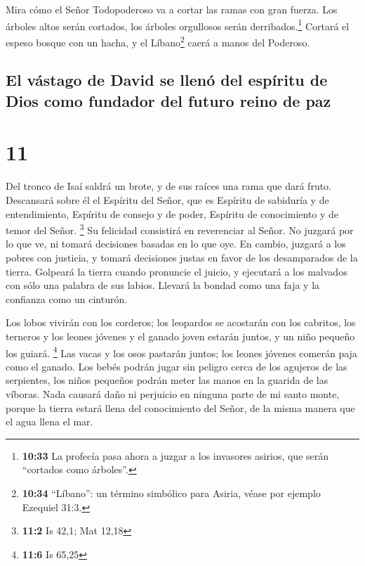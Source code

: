  Mira cómo el Señor Todopoderoso va a cortar las ramas
con gran fuerza. Los árboles altos serán cortados, los árboles
orgullosos serán derribados.\footnote{\textbf{10:33} La profecía pasa
  ahora a juzgar a los invasores asirios, que serán ``cortados como
  árboles''.}  Cortará el espeso bosque con un hacha, y
el Líbano\footnote{\textbf{10:34} ``Líbano'': un término simbólico para
  Asiria, véase por ejemplo Ezequiel 31:3.} caerá a manos del Poderoso.

\hypertarget{el-vuxe1stago-de-david-se-llenuxf3-del-espuxedritu-de-dios-como-fundador-del-futuro-reino-de-paz}{%
\subsection{El vástago de David se llenó del espíritu de Dios como
fundador del futuro reino de
paz}\label{el-vuxe1stago-de-david-se-llenuxf3-del-espuxedritu-de-dios-como-fundador-del-futuro-reino-de-paz}}

\hypertarget{section-10}{%
\section{11}\label{section-10}}

 Del tronco de Isaí saldrá un brote, y de sus raíces una
rama que dará fruto.  Descansará sobre él el Espíritu del
Señor, que es Espíritu de sabiduría y de entendimiento, Espíritu de
consejo y de poder, Espíritu de conocimiento y de temor del Señor.
\footnote{\textbf{11:2} Is 42,1; Mat 12,18}  Su felicidad
consistirá en reverenciar al Señor. No juzgará por lo que ve, ni tomará
decisiones basadas en lo que oye.  En cambio, juzgará a
los pobres con justicia, y tomará decisiones justas en favor de los
desamparados de la tierra. Golpeará la tierra cuando pronuncie el
juicio, y ejecutará a los malvados con sólo una palabra de sus labios.
 Llevará la bondad como una faja y la confianza como un
cinturón.

 Los lobos vivirán con los corderos; los leopardos se
acostarán con los cabritos, los terneros y los leones jóvenes y el
ganado joven estarán juntos, y un niño pequeño los guiará. \footnote{\textbf{11:6}
  Is 65,25}  Las vacas y los osos pastarán juntos; los
leones jóvenes comerán paja como el ganado.  Los bebés
podrán jugar sin peligro cerca de los agujeros de las serpientes, los
niños pequeños podrán meter las manos en la guarida de las víboras.
 Nada causará daño ni perjuicio en ninguna parte de mi
santo monte, porque la tierra estará llena del conocimiento del Señor,
de la misma manera que el agua llena el mar.

